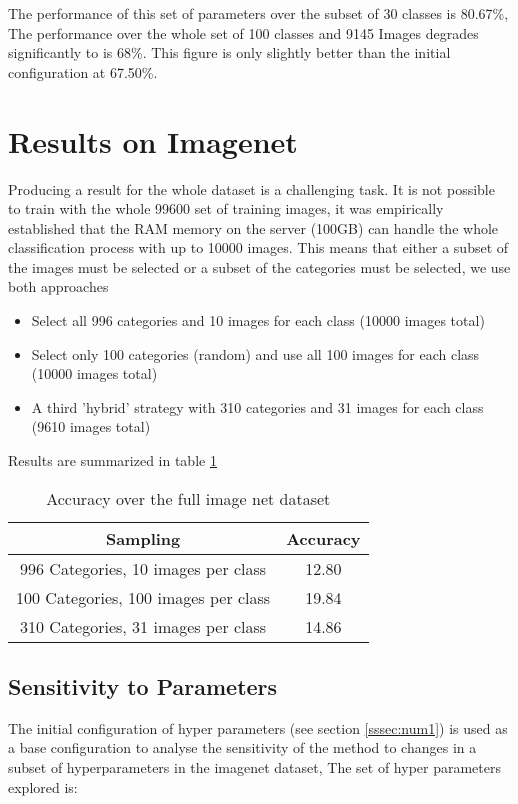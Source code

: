 \documentclass[10pt,twocolumn,letterpaper]{article}
\begin{document}
The performance of this set of parameters over  the subset of 30 classes is 80.67\%, The performance over the whole set of 100 classes and 9145 Images degrades significantly to is 68\%. This figure is only slightly better than the initial configuration at 67.50\%.

\section{Results on Imagenet}

Producing a result for the whole dataset is a challenging task. It is not possible to train with the whole 99600 set of training images, it was empirically established that the RAM memory on the server (100GB) can handle the whole classification process with up to 10000 images.  This means that either a subset of the images must be selected or a subset of the categories must be selected, we use both approaches

\begin{itemize}
\item Select all 996 categories and 10 images for each class (10000 images total)
\item Select only 100 categories (random) and use all 100 images for each class (10000 images total)
\item A third 'hybrid' strategy  with 310 categories and 31 images for each class (9610 images total)
\end{itemize}

Results are summarized in table \ref{table:tableFA}
\begin{table}[t]
\centering
\begin{tabular}{c | c }
Sampling & Accuracy    \\
\hline	
996 Categories, 10 images per class & 12.80  \\
100 Categories, 100 images per class & 19.84 \\
310 Categories, 31 images per class & 14.86 \\

\end{tabular}
\caption{Accuracy over the full image net dataset}
\label{table:tableFA}
\end{table}


\subsection{Sensitivity to Parameters}
The initial configuration of hyper parameters (see section \ref{sssec:num1}) is used as a base configuration to analyse the sensitivity of the method to changes in a subset of hyperparameters in the imagenet dataset, The set of hyper parameters explored is:
\end{document}
